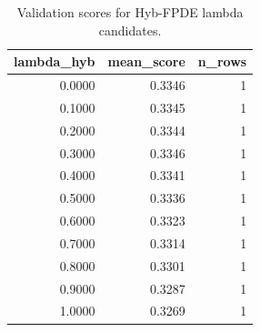 \begin{table}[t]
\caption{Validation scores for Hyb-FPDE lambda candidates.}
\label{tab:lambda_distribution_computed}
\centering
\begin{tabular}{rrr}
\toprule
lambda\_hyb & mean\_score & n\_rows \\
\midrule
0.0000 & 0.3346 & 1 \\
0.1000 & 0.3345 & 1 \\
0.2000 & 0.3344 & 1 \\
0.3000 & 0.3346 & 1 \\
0.4000 & 0.3341 & 1 \\
0.5000 & 0.3336 & 1 \\
0.6000 & 0.3323 & 1 \\
0.7000 & 0.3314 & 1 \\
0.8000 & 0.3301 & 1 \\
0.9000 & 0.3287 & 1 \\
1.0000 & 0.3269 & 1 \\
\bottomrule
\end{tabular}

\end{table}
